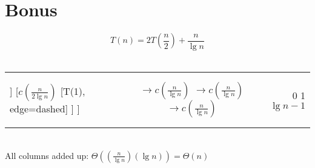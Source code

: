 \documentclass{report}
\begin{document}
\newpage
\section{Bonus}
$$
T(n) = 2T\left(\frac{n}{2}\right) + \frac{n}{\lg n}
$$
\\[10mm]
\begin{tabular}{l c r}
  \begin{forest}
    [$c\left(\frac{n}{\lg n}\right)$
    [$c\left(\frac{n}{2\lg n}\right)$
      [, edge=dashed]
      [, edge=dashed]
    ]
    [$c\left(\frac{n}{2\lg n}\right)$
      [T(1), edge=dashed]
    ]
  ]
\end{forest}
&
\shortstack{$\rightarrow c\left(\frac{n}{\lg n}\right)$ \\[5mm] $\rightarrow c\left(\frac{n}{\lg n}\right)$  \\[4mm] $\rightarrow c\left(\frac{n}{\lg n}\right)$\\[0mm]}
&
\shortstack{0 \\[8mm] 1 \\[8mm] $\lg n - 1$\\[2mm]}
\end{tabular}
\\[3mm]
All columns added up: $\Theta(\left(\frac{n}{\lg n}\right)(\lg n)) = \Theta(n)$
\end{document}

